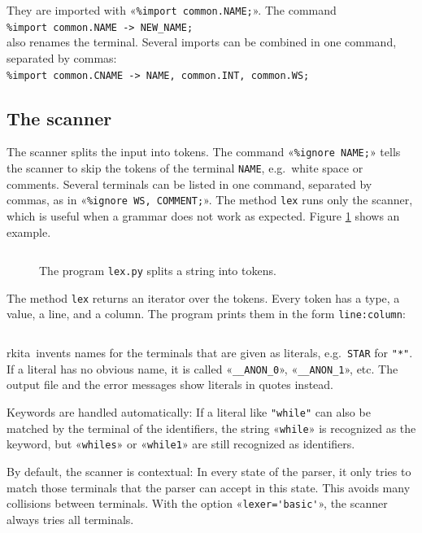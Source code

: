 \documentclass[11pt,a4paper]{article}
\makeatletter
\newcommand{\blue}[1]{{\color{blue}#1}}
\newcommand{\fakesc}[1]{\resizebox{!}{0.99ex}{\textls[90]{\MakeUppercase{#1}}}}
\def\@simtextsc#1#2\@nil{\MakeUppercase{#1}\fakesc{#2}}
\newcommand{\simtextsc}[1]{%
  \ifmmode\text{\@simtextsc#1\@nil}\else\@simtextsc#1\@nil\fi}
\newcommand{\Larkita}{\simtextsc{Larkita}}
\newenvironment{unbreakable}{\par\noindent\begin{minipage}{\linewidth}}{\end{minipage}\par}
\newcommand{\codefigure}[5][]{\begin{figure}[H]%
  \inputminted[numbers = left, numbersep = 0.3cm, #1]{#2}{examples/#3}%
  \vspace*{-0.3cm}%
  \caption{#5}\label{#4}\end{figure}}
\newcommand{\pythonfile}[2]{\codefigure{python3}{#1}{fig:#1}{#2}}
\newcommand{\resultfile}[2][\normalsize]{\begin{unbreakable}%
  \inputminted[fontsize = #1, breaklines]{text}{examples/output/#2.txt}\end{unbreakable}}
\makeatother
\begin{document}
They are imported with «\verb|%import common.NAME;|».  The command
\\[0.2cm]
\hspace*{1.3cm}
\verb|%import common.NAME -> NEW_NAME;|
\\[0.2cm]
also renames the terminal.  Several imports can be combined in one command, separated by commas:
\\[0.2cm]
\hspace*{1.3cm}
\verb|%import common.CNAME -> NAME, common.INT, common.WS;|

\subsection{The scanner}
\label{sec:scanner}
The scanner splits the input into tokens.  The command «\verb|%ignore NAME;|» tells the scanner to skip the
tokens of the terminal \texttt{NAME}, e.g.~white space or comments.  Several terminals can be listed in one
command, separated by commas, as in «\verb|%ignore WS, COMMENT;|».  The method \texttt{lex} runs only the
scanner, which is useful when a grammar does not work as expected.  Figure \ref{fig:lex.py} shows an example.
\pythonfile{lex.py}{The program \texttt{lex.py} splits a string into tokens.}
The method \texttt{lex} returns an iterator over the tokens.  Every token has a type, a value, a line, and a
column.  The program prints them in the form \texttt{line:column}:
\resultfile{lex}
\Larkita\ invents names for the terminals that are given as literals, e.g.~\texttt{STAR} for \verb|"*"|.  If a
literal has no obvious name, it is called «\verb|__ANON_0|», «\verb|__ANON_1|», etc.  The output file and the
error messages show literals in quotes instead.

Keywords are handled automatically:  If a literal like \verb|"while"| can also be matched by the terminal of
the identifiers, the string «\texttt{while}» is recognized as the keyword, but «\texttt{whiles}» or
«\texttt{while1}» are still recognized as identifiers.

By default, the scanner is \blue{contextual}:  In every state of the parser, it only tries to match those
terminals that the parser can accept in this state.  This avoids many collisions between terminals.  With the
option «\verb|lexer='basic'|», the scanner always tries all terminals.
\end{document}
